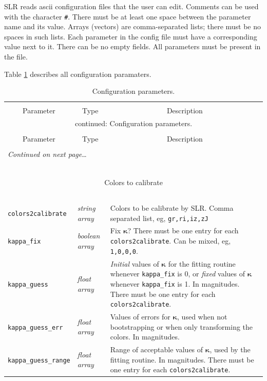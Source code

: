 \documentclass{report}
\newcommand{\zptcolor}{\boldsymbol{\kappa}}
\begin{document}
SLR reads ascii configuration files that the user can edit.  Comments
can be used with the character \verb|#|.  There must be at least one
space between the parameter name and its value.  Arrays (vectors) are
comma-separated lists; there must be no spaces in such lists.  Each
parameter in the config file must have a corresponding value next to
it.  There can be no empty fields.  All parameters must be present in
the file.

Table \ref{tab:config} describes all configuration paramaters.

\begin{center}
\begin{longtable}{llp{2in}}
\caption[Configuration parameters.]{Configuration parameters.}
\label{tab:config} \\
  \hline \hline \\[-2ex]
  \multicolumn{1}{c}{Parameter} &
  \multicolumn{1}{c}{Type} &
  \multicolumn{1}{c}{Description} \\[0.5ex] \hline
\endfirsthead
\multicolumn{3}{c}{{\tablename} \thetable{} continued: Configuration parameters.} \\[0.5ex]
  \hline \hline \\[-2ex]
  \multicolumn{1}{c}{Parameter} &
  \multicolumn{1}{c}{Type} &
  \multicolumn{1}{c}{Description} 
\\[0.5ex] \hline
  \\[-1.8ex]
\endhead
\multicolumn{3}{l}{{{\it Continued on next page}\ldots}} \\
\endfoot
  \\[-1.8ex] \hline \hline
\endlastfoot

~ & ~ & ~ \\ \hline
\multicolumn{3}{c}{Colors to calibrate} \\
\hline ~ & ~ & ~ \\ 

\verb|colors2calibrate| & {\it string array} & Colors to be calibrate by SLR. Comma separated list, eg, \verb|gr,ri,iz,zJ| \\
\verb|kappa_fix| & {\it boolean array} & Fix $\zptcolor$? There must be one entry for each \verb|colors2calibrate|. Can be mixed, eg, \verb|1,0,0,0|. \\
\verb|kappa_guess| & {\it float array} & {\it Initial} values of $\zptcolor$ for the fitting routine whenever \verb|kappa_fix| is 0, or {\it fixed} values of $\mathbf{\kappa}$ whenever \verb|kappa_fix| is 1. In magnitudes. There must be one entry for each \verb|colors2calibrate|. \\
\verb|kappa_guess_err| & {\it float array} & Values of errors for $\zptcolor$, used when not bootstrapping or when only transforming the colors. In magnitudes. \\
\verb|kappa_guess_range| & {\it float array} & Range of acceptable values of $\zptcolor$, used by the fitting routine. In magnitudes. There must be one entry for each \verb|colors2calibrate|. \\


\end{longtable}
\end{center}
\end{document}

